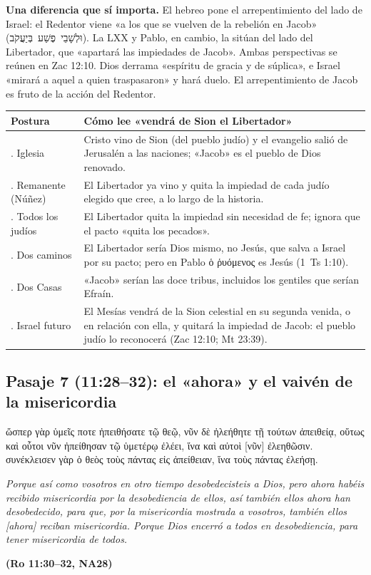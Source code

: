 \documentclass[11pt,letterpaper]{article}
\newcommand{\heb}[1]{\mbox{\foreignlanguage{hebrew}{#1}}}
\newcommand{\grc}[1]{\foreignlanguage{ancientgreek}{#1}}
\newcommand{\fuente}[1]{\par\hfill{\upshape\bfseries\small\textcolor{ladrillo}{#1}}}
\begin{document}
\textbf{Una diferencia que sí importa.} El hebreo pone el arrepentimiento del lado de Israel: el Redentor viene «a los que se vuelven de la rebelión en Jacob» (\heb{וּלְשָׁבֵי פֶשַׁע בְּיַעֲקֹב}). La LXX y Pablo, en cambio, la sitúan del lado del Libertador, que «apartará las impiedades de Jacob». Ambas perspectivas se reúnen en Zac 12:10. Dios derrama «espíritu de gracia y de súplica», e Israel «mirará a aquel a quien traspasaron» y hará duelo. El arrepentimiento de Jacob es fruto de la acción del Redentor.

\begin{center}\footnotesize
\renewcommand{\arraystretch}{1.25}
\begin{tabular}{>{\RaggedRight\arraybackslash}p{2.9cm}>{\RaggedRight\arraybackslash}p{11.1cm}}
\toprule
\textbf{Postura} & \textbf{Cómo lee «vendrá de Sion el Libertador»}\\
\midrule
1. Iglesia & Cristo vino de Sion (del pueblo judío) y el evangelio salió de Jerusalén a las naciones; «Jacob» es el pueblo de Dios renovado.\\
2. Remanente (Núñez) & El Libertador ya vino y quita la impiedad de cada judío elegido que cree, a lo largo de la historia.\\
3. Todos los judíos & El Libertador quita la impiedad sin necesidad de fe; ignora que el pacto «quita los pecados».\\
4. Dos caminos & El Libertador sería Dios mismo, no Jesús, que salva a Israel por su pacto; pero en Pablo \grc{ὁ ῥυόμενος} es Jesús (1~Ts 1:10).\\
5. Dos Casas & «Jacob» serían las doce tribus, incluidos los gentiles que serían Efraín.\\
6. Israel futuro & El Mesías vendrá de la Sion celestial en su segunda venida, o en relación con ella, y quitará la impiedad de Jacob: el pueblo judío lo reconocerá (Zac 12:10; Mt 23:39).\\
\bottomrule
\end{tabular}\end{center}

\subsection{Pasaje 7 (11:28--32): el «ahora» y el vaivén de la misericordia}

\begin{cita}[fontupper=\upshape]
\grc{ὥσπερ γὰρ ὑμεῖς ποτε ἠπειθήσατε τῷ θεῷ, νῦν δὲ ἠλεήθητε τῇ τούτων ἀπειθείᾳ, οὕτως καὶ οὗτοι νῦν ἠπείθησαν τῷ ὑμετέρῳ ἐλέει, ἵνα καὶ αὐτοὶ [νῦν] ἐλεηθῶσιν. συνέκλεισεν γὰρ ὁ θεὸς τοὺς πάντας εἰς ἀπείθειαν, ἵνα τοὺς πάντας ἐλεήσῃ.}\par\smallskip
\itshape Porque así como vosotros en otro tiempo desobedecisteis a Dios, pero ahora habéis recibido misericordia por la desobediencia de ellos, así también ellos ahora han desobedecido, para que, por la misericordia mostrada a vosotros, también ellos [ahora] reciban misericordia. Porque Dios encerró a todos en desobediencia, para tener misericordia de todos.\fuente{(Ro 11:30--32, NA28)}
\end{cita}
\end{document}
